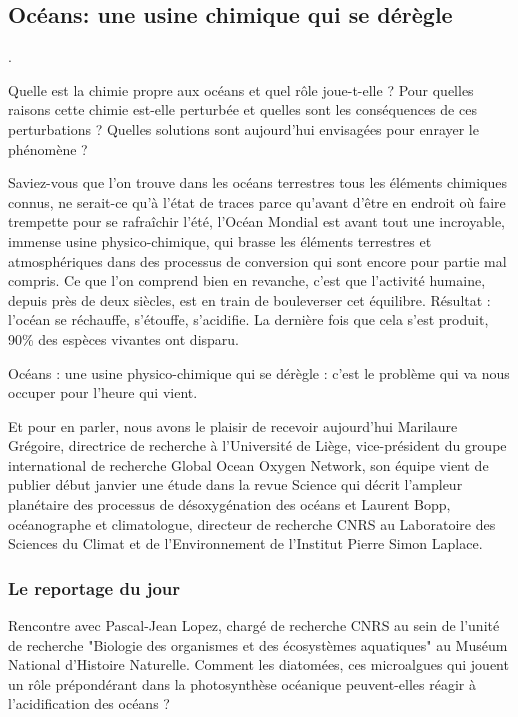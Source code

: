 \subsection{Océans: une usine chimique qui se dérègle}
\label{task:20180318_cj0}

.


Quelle est la chimie propre aux océans et quel rôle joue-t-elle ? Pour quelles raisons cette chimie est-elle perturbée et quelles sont les conséquences de ces perturbations ? Quelles solutions sont aujourd’hui envisagées pour enrayer le phénomène ?

Saviez-vous que l’on trouve dans les océans terrestres tous les éléments chimiques connus, ne serait-ce qu’à l’état de traces parce qu’avant d’être en endroit où faire trempette pour se rafraîchir l’été, l’Océan Mondial est avant tout une incroyable, immense usine physico-chimique, qui brasse les éléments terrestres et atmosphériques dans des processus de conversion qui sont encore pour partie mal compris. Ce que l’on comprend bien en revanche, c’est que l’activité humaine, depuis près de deux siècles, est en train de bouleverser cet équilibre. Résultat : l’océan se réchauffe, s’étouffe, s’acidifie. La dernière fois que cela s’est produit, 90\% des espèces vivantes ont disparu. 

Océans : une usine physico-chimique qui se dérègle : c’est le problème qui va nous occuper pour l’heure qui vient.

Et pour en parler, nous avons le plaisir de recevoir aujourd’hui Marilaure Grégoire, directrice de recherche à l’Université de Liège, vice-président du groupe international de recherche Global Ocean Oxygen Network, son équipe vient de publier début janvier une étude dans la revue Science qui décrit l’ampleur planétaire des processus de désoxygénation des océans et Laurent Bopp, océanographe et climatologue, directeur de recherche CNRS au Laboratoire des Sciences du Climat et de l’Environnement de l’Institut Pierre Simon Laplace.

\subsubsection{Le reportage du jour}

Rencontre avec Pascal-Jean Lopez, chargé de recherche CNRS au sein de l’unité de recherche "Biologie des organismes et des écosystèmes aquatiques" au Muséum National d’Histoire Naturelle. Comment les diatomées, ces microalgues qui jouent un rôle prépondérant dans la photosynthèse océanique peuvent-elles réagir à l’acidification des océans ?